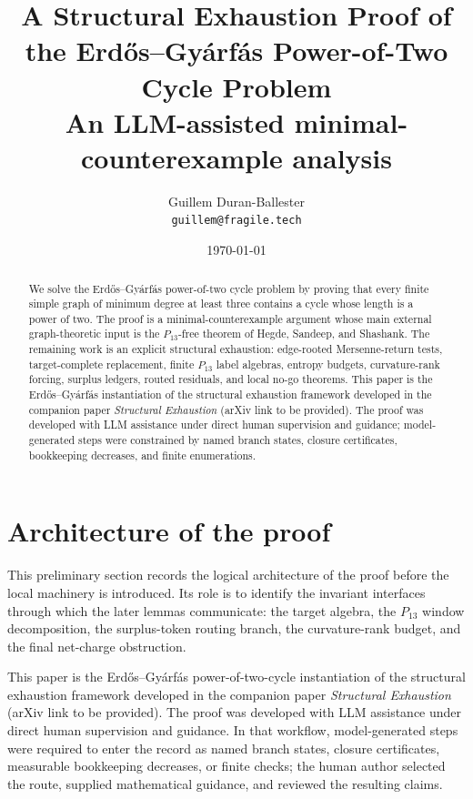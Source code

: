 \documentclass[11pt]{article}
\title{A Structural Exhaustion Proof of the Erd\H{o}s--Gy\'arf\'as
Power-of-Two Cycle Problem\\
\large An LLM-assisted minimal-counterexample analysis}
\author{Guillem Duran-Ballester\\\texttt{guillem@fragile.tech}}
\date{\today}
\begin{document}
\maketitle

\begin{abstract}
We solve the Erd\H{o}s--Gy\'arf\'as power-of-two cycle problem by proving that
every finite simple graph of minimum degree at least three contains a cycle
whose length is a power of two.  The proof is a minimal-counterexample argument
whose main external graph-theoretic input is the $P_{13}$-free theorem of
Hegde, Sandeep, and Shashank.  The remaining work is an explicit structural
exhaustion: edge-rooted Mersenne-return tests, target-complete replacement,
finite $P_{13}$ label algebras, entropy budgets, curvature-rank forcing,
surplus ledgers, routed residuals, and local no-go theorems.  This paper is the
Erd\H{o}s--Gy\'arf\'as instantiation of the structural exhaustion framework
developed in the companion paper \emph{Structural Exhaustion} (arXiv link to be
provided).  The proof was developed with LLM assistance under direct human
supervision and guidance; model-generated steps were constrained by named
branch states, closure certificates, bookkeeping decreases, and finite
enumerations.
\end{abstract}

\tableofcontents

\setcounter{section}{-1}
\section{Architecture of the proof}\label{sec:architecture}

This preliminary section records the logical architecture of the proof before
the local machinery is introduced.  Its role is to
identify the invariant interfaces through which the later lemmas communicate:
the target algebra, the $P_{13}$ window decomposition, the surplus-token
routing branch, the curvature-rank budget, and the final net-charge
obstruction.

This paper is the Erd\H{o}s--Gy\'arf\'as power-of-two-cycle instantiation of
the structural exhaustion framework developed in the companion paper
\emph{Structural Exhaustion} (arXiv link to be provided).  The proof was
developed with LLM assistance under direct human supervision and guidance.  In
that workflow, model-generated steps were required to enter the record as named
branch states, closure certificates, measurable bookkeeping decreases, or
finite checks; the human author selected the route, supplied mathematical
guidance, and reviewed the resulting claims.
\end{document}
